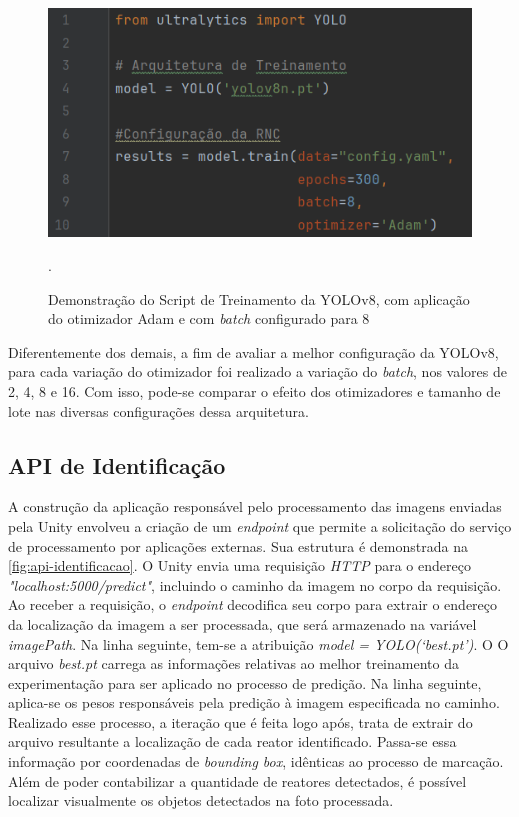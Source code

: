 \begin{figure}[!h]
    \centering
    \begin{minipage}{0.7\linewidth}
    \centering
    \captionsetup{justification=centering,margin=0.5cm,font=small}
    \includegraphics[width=1\linewidth]{img/cap5/yolov8-adam.png}
    \caption{Demonstração do Script de Treinamento da YOLOv8, com aplicação do otimizador Adam e com \textit{batch} configurado para 8}.
    \label{fig:script-yolov8}
    \end{minipage}
\end{figure}

Diferentemente dos demais, a fim de avaliar a melhor configuração da YOLOv8, para cada variação do otimizador foi realizado a variação do \textit{batch}, nos valores de 2, 4, 8 e 16. Com isso, pode-se comparar o efeito dos otimizadores e tamanho de lote nas diversas configurações dessa arquitetura.

\subsection{API de Identificação}

A construção da aplicação responsável pelo processamento das imagens enviadas pela Unity envolveu a criação de um \textit{endpoint} que permite a solicitação do serviço de processamento por aplicações externas. Sua estrutura é demonstrada na \ref{fig:api-identificacao}. O Unity envia uma requisição \textit{HTTP} para o endereço \textit{"localhost:5000/predict"}, incluindo o caminho da imagem no corpo da requisição. Ao receber a requisição, o \textit{endpoint} decodifica seu corpo para extrair o endereço da localização da imagem a ser processada, que será armazenado na variável \textit{imagePath}. Na linha seguinte, tem-se a atribuição \textit{model = YOLO(‘best.pt’)}. O O arquivo \textit{best.pt} carrega as informações relativas ao melhor treinamento da experimentação para ser aplicado no processo de predição. Na linha seguinte, aplica-se os pesos responsáveis pela predição à imagem especificada no caminho. Realizado esse processo, a iteração que é feita logo após, trata de extrair do arquivo resultante a localização de cada reator identificado. Passa-se essa informação por coordenadas de \textit{bounding box}, idênticas ao processo de marcação. Além de poder contabilizar a quantidade de reatores detectados, é possível localizar visualmente os objetos detectados na foto processada.

